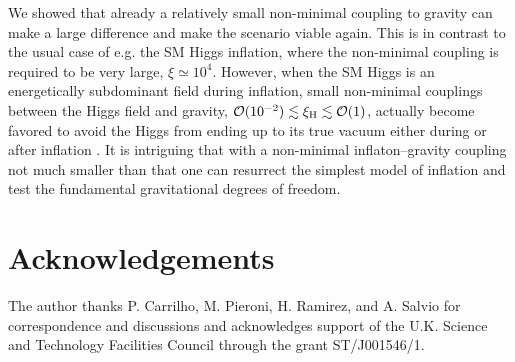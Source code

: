 \documentclass[11pt,a4paper]{article}
\begin{document}
We showed that already a relatively small non-minimal coupling to gravity can make a large difference and make the scenario viable again. This is in contrast to the usual case of e.g. the SM Higgs inflation, where the non-minimal coupling is required to be very large, $\xi\simeq 10^4$. However, when the SM Higgs is an energetically subdominant field during inflation, small non-minimal couplings between the Higgs field and gravity, $\mathcal{O}(10^{-2})\lesssim \xi_{\rm H} \lesssim \mathcal{O}(1)$, actually become favored to avoid the Higgs from ending up to its true vacuum either during or after inflation \cite{Herranen:2014cua, Herranen:2015ima,Espinosa:2015qea,Ema:2016kpf,Kohri:2016wof,Joti:2017fwe,Figueroa:2017slm}. It is intriguing that with a non-minimal inflaton--gravity coupling not much smaller than that one can resurrect the simplest model of inflation and test the fundamental gravitational degrees of freedom.


 
\section*{Acknowledgements}
The author thanks P. Carrilho, M. Pieroni, H. Ramirez, and A. Salvio for correspondence and discussions and acknowledges support of the U.K. Science and Technology Facilities Council through the grant ST/J001546/1.





\end{document}
